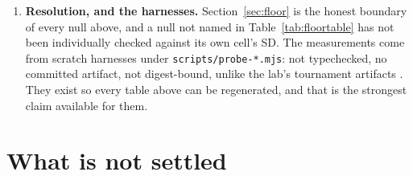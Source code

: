\documentclass[11pt]{article}
\newcommand{\code}[1]{\texttt{#1}}
\begin{document}
\begin{enumerate}
  mechanism, and it is also a bound on the standing figures: their bots are not being played with
  everything the host gives them.
\item \textbf{Resolution, and the harnesses.} Section~\ref{sec:floor} is the honest boundary of
  every null above, and a null not named in Table~\ref{tab:floortable} has not been individually
  checked against its own cell's SD. The measurements come from scratch harnesses under
  \code{scripts/probe-*.mjs}: not typechecked, no committed artifact, not digest-bound, unlike the
  lab's tournament artifacts \cite{botlab,repo}. They exist so every table above can be regenerated,
  and that is the strongest claim available for them.
\end{enumerate}

\section{What is not settled}
\label{sec:open}
\end{document}
